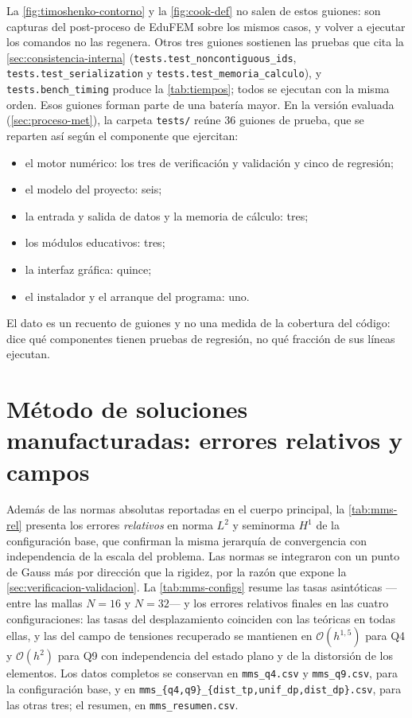 La \autoref{fig:timoshenko-contorno} y la \autoref{fig:cook-def} no salen de estos guiones: son capturas del post-proceso de EduFEM sobre los mismos casos, y volver a ejecutar los comandos no las regenera. Otros tres guiones sostienen las pruebas que cita la \autoref{sec:consistencia-interna} (\texttt{tests.test\_noncontiguous\_ids}, \texttt{tests.test\_serialization} y \texttt{tests.test\_memoria\_calculo}), y \texttt{tests.bench\_timing} produce la \autoref{tab:tiempos}; todos se ejecutan con la misma orden. Esos guiones forman parte de una batería mayor. En la versión evaluada (\autoref{sec:proceso-met}), la carpeta \texttt{tests/} reúne 36 guiones de prueba, que se reparten así según el componente que ejercitan:

\begin{itemize}
    \item el motor numérico: los tres de verificación y validación y cinco de regresión;
    \item el modelo del proyecto: seis;
    \item la entrada y salida de datos y la memoria de cálculo: tres;
    \item los módulos educativos: tres;
    \item la interfaz gráfica: quince;
    \item el instalador y el arranque del programa: uno.
\end{itemize}

El dato es un recuento de guiones y no una medida de la cobertura del código: dice qué componentes tienen pruebas de regresión, no qué fracción de sus líneas ejecutan.

\section{Método de soluciones manufacturadas: errores relativos y campos}

Además de las normas absolutas reportadas en el cuerpo principal, la \autoref{tab:mms-rel} presenta los errores \emph{relativos} en norma $L^2$ y seminorma $H^1$ de la configuración base, que confirman la misma jerarquía de convergencia con independencia de la escala del problema. Las normas se integraron con un punto de Gauss más por dirección que la rigidez, por la razón que expone la \autoref{sec:verificacion-validacion}. La \autoref{tab:mms-configs} resume las tasas asintóticas ---entre las mallas $N=16$ y $N=32$--- y los errores relativos finales en las cuatro configuraciones: las tasas del desplazamiento coinciden con las teóricas en todas ellas, y las del campo de tensiones recuperado se mantienen en $\mathcal{O}(h^{1{,}5})$ para Q4 y $\mathcal{O}(h^{2})$ para Q9 con independencia del estado plano y de la distorsión de los elementos. Los datos completos se conservan en \texttt{mms\_q4.csv} y \texttt{mms\_q9.csv}, para la configuración base, y en \texttt{mms\_\{q4,q9\}\_\{dist\_tp,unif\_dp,dist\_dp\}.csv}, para las otras tres; el resumen, en \texttt{mms\_resumen.csv}.

